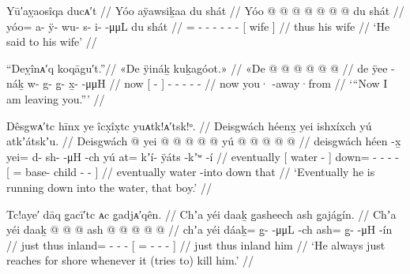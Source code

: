 \ex\label{ex:91-153-he-said-to-his-wife}%
%
\begingl
	\glpreamble	Yū′aỵaosîqa ducᴀ′t //
	\glpreamble	Yóo aÿawsiḵaa du shát //
	\gla	Yóo @  @ {} @ {} @ {} @ {} @ {} @ {}
		{} du shát {} //
	\glb	yóo= a- ÿ- wu- s- i-  -μμL
		{} du shát {} //
	\glc	{}= - - - - -
			 -
		{}[  wife {}] //
	\gld	thus  {} {} {} {} {} {}
		{} his wife {} //
	\glft	‘He said to his wife’
		//
\endgl
\xe

\ex\label{ex:91-154-now-leaving}%
%
\begingl
	\glpreamble	 “Deỵînᴀ′q koqāgu′t.”//
	\glpreamble	 «\!De ÿináḵ kuḵagóot.\!» //
	\gla	«\!De {}  @ {} {}
		 @ {} @ {} @ {} @ {} @ {} //
	\glb	\pqp{}de {} ÿee -náḵ {}
		w- g- g̱- x̱-  -μμH //
	\glc	\pqp{}now {}[  - {}]
		- - - -  - //
	\gld	\pqp{}now {} you· -away·from {}
		 {} {} {} {} {} //
	\glft	‘“Now I am leaving you.”’
		//
\endgl
\xe

\ex\label{ex:91-155-running-down-into-water}%
%
\begingl
	\glpreamble	Dêsgwᴀ′tc hīnx ye îcx̣îx̣tc yuᴀtk!ᴀ′tsk!ᵒ. //
	\glpreamble	Deisgwách héenx̱ yei ishxíxch yú atkʼátskʼu. //
	\gla	Deisgwách {}  @ {} {}
		yei @  @ {} @ {} @ {} @ {}
		{} yú  @ {} @ {} @ {} @ {} @ {} //
	\glb	deisgwách {} héen -x̱ {}
		yei= d- sh-  -μH -ch
		{} yú at= kʼí- ÿáts -kʼʷ -í {} //
	\glc	eventually {}[ water - {}]
		down= - -  - -
		{}[  = base- child - - {}] //
	\gld	eventually {} water -into {}
		down  {} {} {} {}
		{} that  {} {} {} {} {} //
	\glft	‘Eventually he is running down into the water, that boy.’
		//
\endgl
\xe

\ex\label{ex:91-156-reach-shore-whenever-kill}%
%
\begingl
	\glpreamble	Tc!aye′ dāq g̣acī′tc ᴀc g̣adjᴀ′qên. //
	\glpreamble	Chʼa yéi daaḵ g̱asheech ash g̱ajág̱ín. //
	\gla	Chʼa yéi daaḵ  @ {} @ {} @ {}
		{} ash @  @ {} @ {} @ {} @ {} {} //
	\glb	chʼa yéi dáaḵ= g̱-  -μμL -ch
		{} ash= {} g̱-  -μH -ín {} //
	\glc	just thus inland= -  - -
		{}[ = \· -
			 - - {}] //
	\gld	just thus inland  {} {} {}
		{} him  {} {} {} {} {} //
	\glft	‘He always just reaches for shore whenever it (tries to) kill him.’
		//
\endgl
\xe

